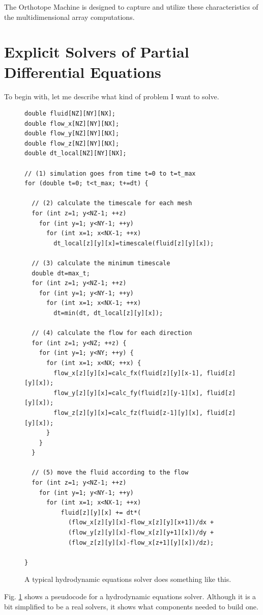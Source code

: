 \documentclass[twocolumn]{article}
\begin{document}
The Orthotope Machine is designed to capture and utilize these
characteristics of the multidimensional array computations.

\section{Explicit Solvers of Partial Differential Equations}

To begin with, let me describe what kind of problem I want to solve.

\begin{figure}
\begin{verbatim}
double fluid[NZ][NY][NX];
double flow_x[NZ][NY][NX];
double flow_y[NZ][NY][NX];
double flow_z[NZ][NY][NX];
double dt_local[NZ][NY][NX];

// (1) simulation goes from time t=0 to t=t_max
for (double t=0; t<t_max; t+=dt) {

  // (2) calculate the timescale for each mesh
  for (int z=1; y<NZ-1; ++z) 
    for (int y=1; y<NY-1; ++y) 
      for (int x=1; x<NX-1; ++x) 
        dt_local[z][y][x]=timescale(fluid[z][y][x]);

  // (3) calculate the minimum timescale
  double dt=max_t;
  for (int z=1; y<NZ-1; ++z) 
    for (int y=1; y<NY-1; ++y) 
      for (int x=1; x<NX-1; ++x) 
        dt=min(dt, dt_local[z][y][x]);

  // (4) calculate the flow for each direction
  for (int z=1; y<NZ; ++z) {
    for (int y=1; y<NY; ++y) { 
      for (int x=1; x<NX; ++x) { 
        flow_x[z][y][x]=calc_fx(fluid[z][y][x-1], fluid[z][y][x]);
        flow_y[z][y][x]=calc_fy(fluid[z][y-1][x], fluid[z][y][x]);
        flow_z[z][y][x]=calc_fz(fluid[z-1][y][x], fluid[z][y][x]);
      }
    }
  }

  // (5) move the fluid according to the flow
  for (int z=1; y<NZ-1; ++z) 
    for (int y=1; y<NY-1; ++y) 
      for (int x=1; x<NX-1; ++x)
          fluid[z][y][x] += dt*(
            (flow_x[z][y][x]-flow_x[z][y][x+1])/dx +
            (flow_y[z][y][x]-flow_x[z][y+1][x])/dy +
            (flow_z[z][y][x]-flow_x[z+1][y][x])/dz);

}
\end{verbatim}
\caption{A typical hydrodynamic equations solver does something like
  this.}\label{FigureHydroPseudoCode}
\end{figure}

Fig. \ref{FigureHydroPseudoCode} shows a pseudocode for a hydrodynamic
equations solver. Although it is a bit simplified to be a real solvers, it
shows what components needed to build one.
\end{document}
